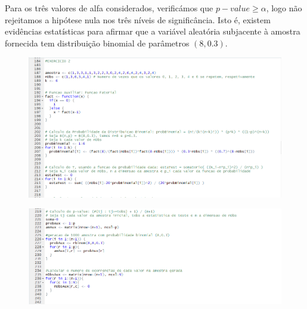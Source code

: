 \documentclass{article}
\begin{document}
				\noindent Para os três valores de alfa considerados, verificámos que $p-value \geq \alpha$, logo não rejeitamos a hipótese nula nos três níveis de significância. Isto é, existem evidências estatísticas para afirmar que a variável aleatória subjacente à amostra fornecida tem distribuição binomial de parâmetros $(8, 0.3)$.
				
\newpage			
			
				\begin{figure}[!h]
					\includegraphics[scale=0.45]{oi}
				\end{figure}
				\begin{figure}[!h]
					\includegraphics[scale=0.45]{oi2}
				\end{figure}
				
\newpage				
				
\end{document}
